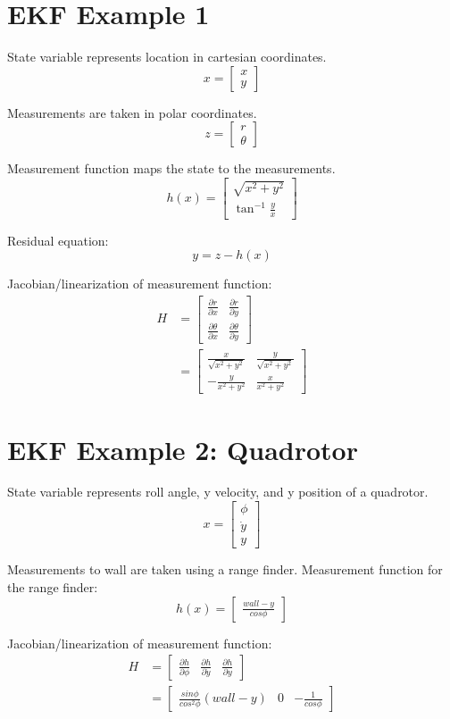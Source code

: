 \documentclass[10pt]{article}
\begin{document}
\section*{\normalsize EKF Example 1}

State variable represents location in cartesian coordinates.
$$x = \begin{bmatrix}
x\\
y
\end{bmatrix}$$

Measurements are taken in polar coordinates.
$$z = \begin{bmatrix}
r\\
\theta
\end{bmatrix}$$

Measurement function maps the state to the measurements.
$$h(x) = \begin{bmatrix}
\sqrt{x^2 + y^2}\\
\tan^{-1}{\frac{y}{x}}
\end{bmatrix}$$

Residual equation:
$$y = z - h(x)$$

Jacobian/linearization of measurement function:
\begin{align*}
	H &= \begin{bmatrix}
	\frac{\partial r}{\partial x} & \frac{\partial r}{\partial y}\\
	\frac{\partial \theta}{\partial x} & \frac{\partial \theta}{\partial y}
	\end{bmatrix}\\
	&= \begin{bmatrix}
	\frac{x}{\sqrt{x^2 + y^2}} & \frac{y}{\sqrt{x^2 + y^2}}\\
	-\frac{y}{x^2 + y^2} & \frac{x}{x^2 + y^2}
	\end{bmatrix}
\end{align*}

\section*{\normalsize EKF Example 2: Quadrotor}

State variable represents roll angle, y velocity, and y position of a quadrotor.
$$x = \begin{bmatrix}
\phi\\
\dot{y}\\
y
\end{bmatrix}$$

Measurements to wall are taken using a range finder. Measurement function for the range finder:
$$h(x) = \begin{bmatrix}
\frac{wall - y}{cos \phi}
\end{bmatrix}$$

Jacobian/linearization of measurement function:
\begin{align*}
	H &= \begin{bmatrix}
	\frac{\partial h}{\partial \phi} & \frac{\partial h}{\partial \dot{y}} & \frac{\partial h}{\partial y}
	\end{bmatrix}\\
	&= \begin{bmatrix}
	\frac{sin \phi}{cos^2 \phi}(wall - y) & 0 & -\frac{1}{cos \phi}
	\end{bmatrix}
\end{align*}
\end{document}
